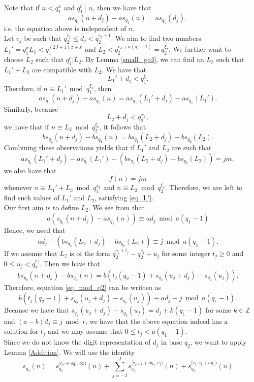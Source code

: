 \documentclass[12pt]{amsart}
\renewcommand{\leq}{\leqslant}
\renewcommand{\geq}{\geqslant}
\theoremstyle{definition}
\numberwithin{equation}{section}
\newcommand\ZZ{\mathbb{Z}}
\numberwithin{equation}{section}
\begin{document}
Note that if $n< q_1^{x}$ and $q_1^{\tilde{c}}\mid n$, then we have that
\[
	as_{q_1}(n+d_j)-as_{q_1}(n) = as_{q_1}(d_j),
\]
i.e. the equation above is independent of $n$.\\

Let $c_j$ be such that $q_2^{c_j}\leq d_j < q_2^{c_j+1}$. We aim to find two numbers $L_1' = q_1^{x}L_1<q_1^{(2J+1)\beta+x}$ and $L_2<q_2^{c_J+a(q_1-1)} = q_2^{\xi_2}$. We further want to choose $L_2$ such that $q_1^{\tilde{c}}|L_2$. By Lemma \ref{small_gcd}, we can find an $L_3$ such that $L_1'+L_3$ are compatible with $L_2$. We have that
\[
	L_1'+d_j < q_1^{\xi}.
\]
Therefore, if $n \equiv L_1'\bmod q_1^{\xi_1}$, then
\[
	as_{q_1}(n+d_j)-as_{q_1}(n) = as_{q_1}( L_1'+d_j)-as_{q_1}( L_1').
\]
Similarly, because
\[
	L_2+d_j< q_2^{x_2},
\]
we have that if $n\equiv L_2 \bmod q_2^{\xi_2}$, it follows that
\[
	bs_{q_2}(n+d_j)-bs_{q_2}(n) = bs_{q_2}( L_2+d_j)-bs_{q_2}( L_2).
\]
Combining these observations yields that if $L_1'$ and $L_2$ are such that
\begin{equation}\label{eq_L'}
	as_{q_1}( L_1'+d_j)-as_{q_1}( L_1') - (bs_{q_2}( L_2+d_j)-bs_{q_2}( L_2))=jm,
\end{equation}
we also have that
\[
	f(n)=jm
\]
whenever $n\equiv L_1'+L_3 \bmod q_1^{x_1}$ and $n\equiv L_2 \bmod q_2^{\xi_2}$. Therefore, we are left to find such values of $L_1'$ and $L_2$, satisfying \eqref{eq_L'}.\\

Our first aim is to define $L_2$. We see from that
\[
	a(s_{q_1}(n+d_j)-as_{q_1}(n)) \equiv  ad_j \bmod a(q_1-1)
\]
Hence, we need that
\begin{equation}\label{eq_mod_q2}
	ad_j - (bs_{q_2}(L_2+d_j)-bs_{q_2}(L_2))\equiv j \bmod a(q_1-1).
\end{equation}
If we assume that $L_2$ is of the form $q_2^{c_j+t_j}-q_2^{c_j}+u_j$ for some integer $t_j\geq0$ and $0\leq u_j<q_2^{c_j}$. Then we have that
\[
	bs_{q_2}(n+d_j)-bs_{q_2}(n) = b(t_j(q_2-1) + s_{q_2}(u_j+d_j)-s_{q_2}(u_j)).
\]
Therefore, equation \eqref{eq_mod_q2} can be written as 
\[
	b(t_j(q_2-1) + s_{q_2}(u_j+d_j)-s_{q_2}(u_j)) \equiv ad_j-j \bmod a(q_1-1).
\]
Because we have that $s_{q_2}(u_j+d_j)-s_{q_2}(u_j) = d_j + k(q_1-1)$ for some $k\in \ZZ$ and $(a-b)d_j \equiv j \bmod r$, we have that the above equation indeed has a solution for $t_j$ and we may assume that $0\leq t_j < a(q_1-1)$.\\

Since we do not know the digit representation of $d_j$ in base $q_2$, we want to apply Lemma \ref{Addition}. We will use the identity
\[
	s_{q_2}(n) = s_{q_2}^{[c_J+aq_1, \infty)}(n) + \sum_{j=-J}^{J}s_{q_2}^{[c_{j-1}+aq_1, c_j)}(n) + s_{q_2}^{[c_{j}, c_j+aq_1)}(n)
\]
\end{document}
